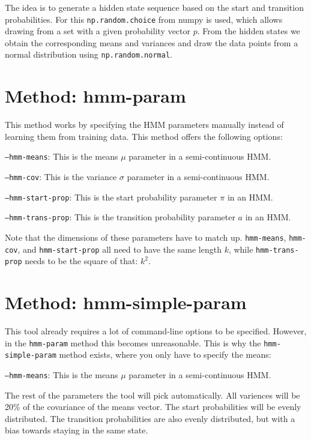 The idea is to generate a hidden state sequence based on the start and transition probabilities. For this \texttt{np.random.choice} from numpy is used, which allows drawing from a set with a given probability vector $p$. From the hidden states we obtain the corresponding means and variances and draw the data points from a normal distribution using \texttt{np.random.normal}.

\section{Method: hmm-param}

This method works by specifying the HMM parameters manually instead of learning them from training data. This method offers the following options: 

\texttt{---hmm-means}: This is the means $\mu$ parameter in a semi-continuous HMM. 

\texttt{---hmm-cov}: This is the variance $\sigma$ parameter in a semi-continuous HMM. 

\texttt{---hmm-start-prop}: This is the start probability parameter $\pi$ in an HMM. 

\texttt{---hmm-trans-prop}: This is the transition probability parameter $a$ in an HMM. 

Note that the dimensions of these parameters have to match up. \texttt{hmm-means}, \texttt{hmm-cov}, and \texttt{hmm-start-prop} all need to have the same length $k$, while \texttt{hmm-trans-prop} needs to be the square of that: $k^2$. 

\section{Method: hmm-simple-param}

This tool already requires a lot of command-line options to be specified. However, in the \texttt{hmm-param} method this becomes unreasonable. This is why the \texttt{hmm-simple-param} method exists, where you only have to specify the means: 

\texttt{---hmm-means}: This is the means $\mu$ parameter in a semi-continuous HMM. 

The rest of the parameters the tool will pick automatically. All variences will be 20\% of the covariance of the means vector. The start probabilities will be evenly distributed. The transition probabilities are also evenly distributed, but with a bias towards staying in the same state. 

